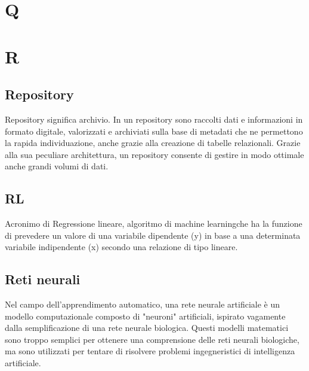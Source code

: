 
\clearpage
\section*{Q}

\clearpage
\section*{R}

\subsection*{Repository}

Repository significa archivio. In un repository sono raccolti dati e informazioni in formato digitale, valorizzati e archiviati sulla base di metadati che ne permettono la rapida individuazione, anche grazie alla creazione di tabelle relazionali. Grazie alla sua peculiare architettura, un repository consente di gestire in modo ottimale anche grandi volumi di dati.


\subsection*{RL}
Acronimo di Regressione lineare, algoritmo di machine learning\glosp che ha la funzione di prevedere un valore di una variabile dipendente (y) in base a una determinata variabile indipendente (x) secondo una relazione di tipo lineare.

\subsection*{Reti neurali}
Nel campo dell'apprendimento automatico, una rete neurale artificiale  è un modello computazionale composto di "neuroni" artificiali, ispirato vagamente dalla semplificazione di una rete neurale biologica. Questi modelli matematici sono troppo semplici per ottenere una comprensione delle reti neurali biologiche, ma sono utilizzati per tentare di risolvere problemi ingegneristici di intelligenza artificiale.

